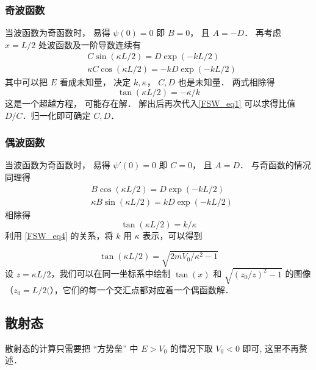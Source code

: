 \subsubsection{奇波函数}
当波函数为奇函数时， 易得 $\psi(0) = 0$ 即 $B = 0$， 且 $A = -D$． 再考虑 $x = L/2$ 处波函数及一阶导数连续有
\begin{equation}\label{FSW_eq1}
\begin{aligned}
&C\sin(\kappa L/2) = D \exp(-kL/2)\\
&\kappa C \cos(\kappa L/2) = -kD \exp(-kL/2)
\end{aligned}
\end{equation}
其中可以把 $E$ 看成未知量， 决定 $k, \kappa$， $C,D$ 也是未知量． 两式相除得
\begin{equation}\label{FSW_eq2}
\tan(\kappa L/2) = -\kappa/k
\end{equation}
这是一个超越方程， 可能存在解． 解出后再次代入\autoref{FSW_eq1} 可以求得比值 $D/C$．归一化即可确定 $C, D$．

\subsubsection{偶波函数}
当波函数为奇函数时， 易得 $\psi'(0) = 0$ 即 $C = 0$， 且 $A = D$． 与奇函数的情况同理得
\begin{equation}
\begin{aligned}
&B\cos(\kappa L/2) = D \exp(-kL/2)\\
&\kappa B \sin(\kappa L/2) = kD \exp(-kL/2)
\end{aligned}
\end{equation}
相除得
\begin{equation}\label{FSW_eq3}
\tan(\kappa L/2) = k/\kappa
\end{equation}
利用 \autoref{FSW_eq4} 的关系，将 $k$ 用 $\kappa$ 表示，可以得到

\begin{equation}
\tan(\kappa L/2)=\sqrt{2mV_0/\kappa^2-1}
\end{equation}
设 $z=\kappa L/2$，我们可以在同一坐标系中绘制 $\tan(x)$ 和 $\sqrt{(z_0/z)^2-1}$ 的图像（$z_0=L/2($），它们的每一个交汇点都对应着一个偶函数解．




\subsection{散射态}

散射态的计算只需要把 “方势垒” 中 $E > V_0$ 的情况下取 $V_0 < 0$ 即可, 这里不再赘述．
